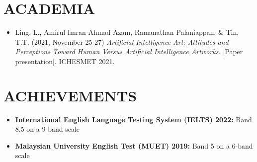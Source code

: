\documentclass[a4paper,11pt]{article}
\newcommand{\resumeItem}[2]{
  \item\small{
    \textbf{{#1:} }{#2 \vspace{-2pt}}
  }
}
\newcommand{\resumeSubItem}[2]{\resumeItem{#1}{#2}\vspace{-4pt}}
\newcommand{\resumeSubHeadingListStart}{\begin{itemize}[leftmargin=*]}
\newcommand{\resumeSubHeadingListEnd}{\end{itemize}}
\begin{document}
\section{ACADEMIA}
 {\small
  \begin{itemize}[leftmargin=*]{\footnotesize}
    \item{Ling, L., Amirul Imran Ahmad Azam, Ramanathan Palaniappan, \& Tin, T.T. (2021, November 25-27) \textit{Artificial Intelligence Art: Attitudes and Perceptions Toward Human Versus Artificial Intelligence Artworks.} [Paper presentation]. ICHESMET 2021. \vspace{-2pt}}
  \end{itemize}
 }


\section{ACHIEVEMENTS}
\resumeSubHeadingListStart
\resumeSubItem{International English Language Testing System (IELTS) 2022}{\colorbox{MyHighlight}{Band 8.5} on a 9-band scale}
\resumeSubItem{Malaysian University English Test (MUET) 2019}{Band 5 on a 6-band scale}
\resumeSubHeadingListEnd


\end{document}
